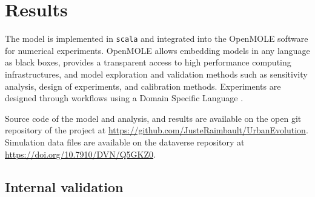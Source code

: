 \documentclass[letterpaper]{article}
\begin{document}
\section{Results}

The model is implemented in \texttt{scala} and integrated into the OpenMOLE software \citep{reuillon2013openmole} for numerical experiments. OpenMOLE allows embedding models in any language as black boxes, provides a transparent access to high performance computing infrastructures, and model exploration and validation methods such as sensitivity analysis, design of experiments, and calibration methods. Experiments are designed through workflows using a Domain Specific Language \citep{passerat2017reproducible}.

Source code of the model and analysis, and results are available on the open git repository of the project at \url{https://github.com/JusteRaimbault/UrbanEvolution}. Simulation data files are available on the dataverse repository at \url{https://doi.org/10.7910/DVN/Q5GKZ0}.

\subsection{Internal validation}

\end{document}
